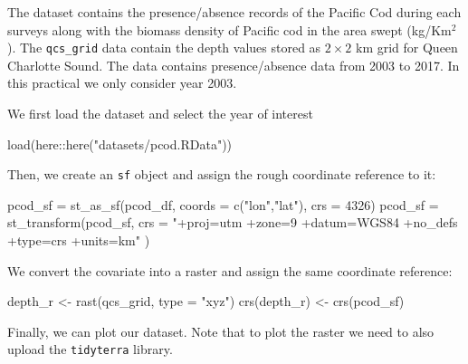 \documentclass[
  letterpaper,
  DIV=11,
  numbers=noendperiod]{scrartcl}
\newenvironment{Shaded}{\begin{snugshade}}{\end{snugshade}}
\newcommand{\AttributeTok}[1]{\textcolor[rgb]{0.40,0.45,0.13}{#1}}
\newcommand{\DecValTok}[1]{\textcolor[rgb]{0.68,0.00,0.00}{#1}}
\newcommand{\FunctionTok}[1]{\textcolor[rgb]{0.28,0.35,0.67}{#1}}
\newcommand{\NormalTok}[1]{\textcolor[rgb]{0.00,0.23,0.31}{#1}}
\newcommand{\OtherTok}[1]{\textcolor[rgb]{0.00,0.23,0.31}{#1}}
\newcommand{\SpecialCharTok}[1]{\textcolor[rgb]{0.37,0.37,0.37}{#1}}
\newcommand{\StringTok}[1]{\textcolor[rgb]{0.13,0.47,0.30}{#1}}
\begin{document}
The dataset contains the presence/absence records of the Pacific Cod
during each surveys along with the biomass density of Pacific cod in the
area swept (kg/Km\(^2\)). The \texttt{qcs\_grid} data contain the depth
values stored as \(2\times 2\) km grid for Queen Charlotte Sound. The
data contains presence/absence data from 2003 to 2017. In this practical
we only consider year 2003.

We first load the dataset and select the year of interest

\begin{Shaded}
\begin{Highlighting}[]
\FunctionTok{load}\NormalTok{(here}\SpecialCharTok{::}\FunctionTok{here}\NormalTok{(}\StringTok{"datasets/pcod.RData"}\NormalTok{))}
\end{Highlighting}
\end{Shaded}

Then, we create an \texttt{sf} object and assign the rough coordinate
reference to it:

\begin{Shaded}
\begin{Highlighting}[]
\NormalTok{pcod\_sf }\OtherTok{=}   \FunctionTok{st\_as\_sf}\NormalTok{(pcod\_df, }\AttributeTok{coords =} \FunctionTok{c}\NormalTok{(}\StringTok{"lon"}\NormalTok{,}\StringTok{"lat"}\NormalTok{), }\AttributeTok{crs =} \DecValTok{4326}\NormalTok{)}
\NormalTok{pcod\_sf }\OtherTok{=} \FunctionTok{st\_transform}\NormalTok{(pcod\_sf,}
\AttributeTok{crs =} \StringTok{"+proj=utm +zone=9 +datum=WGS84 +no\_defs +type=crs +units=km"}\NormalTok{ )}
\end{Highlighting}
\end{Shaded}

We convert the covariate into a raster and assign the same coordinate
reference:

\begin{Shaded}
\begin{Highlighting}[]
\NormalTok{depth\_r }\OtherTok{\textless{}{-}} \FunctionTok{rast}\NormalTok{(qcs\_grid, }\AttributeTok{type =} \StringTok{"xyz"}\NormalTok{)}
\FunctionTok{crs}\NormalTok{(depth\_r) }\OtherTok{\textless{}{-}} \FunctionTok{crs}\NormalTok{(pcod\_sf)}
\end{Highlighting}
\end{Shaded}

Finally, we can plot our dataset. Note that to plot the raster we need
to also upload the \texttt{tidyterra} library.
\end{document}
